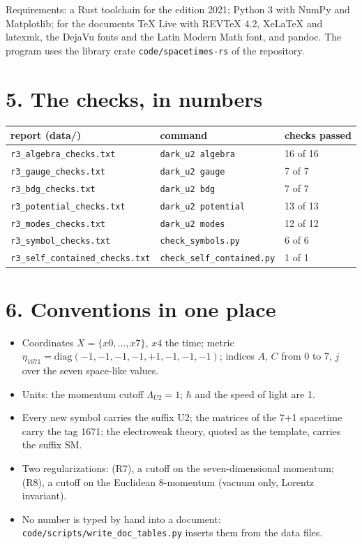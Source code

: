 \documentclass[
  10pt,
]{article}
\providecommand{\tightlist}{%
  \setlength{\itemsep}{0pt}\setlength{\parskip}{0pt}}
\begin{document}
Requirements: a Rust toolchain for the edition 2021; Python 3 with NumPy
and Matplotlib; for the documents TeX Live with REVTeX 4.2, XeLaTeX and
latexmk, the DejaVu fonts and the Latin Modern Math font, and pandoc.
The program uses the library crate \texttt{code/spacetimes-rs} of the
repository.

\hypertarget{the-checks-in-numbers}{%
\section{5. The checks, in numbers}\label{the-checks-in-numbers}}

\begin{longtable}[]{@{}lll@{}}
\toprule\noalign{}
report (data/) & command & checks passed \\
\midrule\noalign{}
\endhead
\bottomrule\noalign{}
\endlastfoot
\texttt{r3\_algebra\_checks.txt} & \texttt{dark\_u2\ algebra} & 16 of
16 \\
\texttt{r3\_gauge\_checks.txt} & \texttt{dark\_u2\ gauge} & 7 of 7 \\
\texttt{r3\_bdg\_checks.txt} & \texttt{dark\_u2\ bdg} & 7 of 7 \\
\texttt{r3\_potential\_checks.txt} & \texttt{dark\_u2\ potential} & 13
of 13 \\
\texttt{r3\_modes\_checks.txt} & \texttt{dark\_u2\ modes} & 12 of 12 \\
\texttt{r3\_symbol\_checks.txt} & \texttt{check\_symbols.py} & 6 of 6 \\
\texttt{r3\_self\_contained\_checks.txt} &
\texttt{check\_self\_contained.py} & 1 of 1 \\
\end{longtable}

\hypertarget{conventions-in-one-place}{%
\section{6. Conventions in one place}\label{conventions-in-one-place}}

\begin{itemize}
\tightlist
\item
  Coordinates \(X=\{x0,\dots,x7\}\), \(x4\) the time; metric
  \(\eta_{1671}=\mathrm{diag}(-1,-1,-1,-1,+1,-1,-1,-1)\); indices \(A\),
  \(C\) from 0 to 7, \(j\) over the seven space-like values.
\item
  Units: the momentum cutoff \(\Lambda_{U2}=1\); \(\hbar\) and the speed
  of light are 1.
\item
  Every new symbol carries the suffix U2; the matrices of the 7+1
  spacetime carry the tag 1671; the electroweak theory, quoted as the
  template, carries the suffix SM.
\item
  Two regularizations: (R7), a cutoff on the seven-dimensional momentum;
  (R8), a cutoff on the Euclidean 8-momentum (vacuum only, Lorentz
  invariant).
\item
  No number is typed by hand into a document:
  \texttt{code/scripts/write\_doc\_tables.py} inserts them from the data
  files.
\end{itemize}
\end{document}
